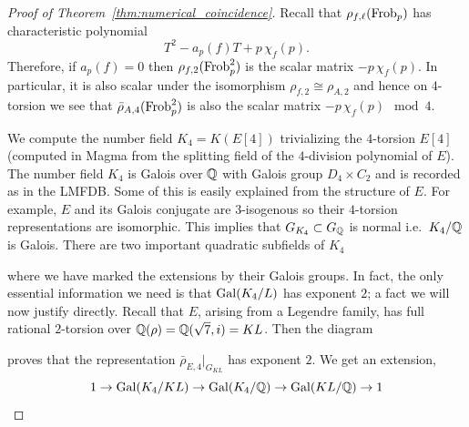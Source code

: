 \documentclass[main.tex]{subfiles}
\begin{document}
\begin{proof}[Proof of Theorem~\ref{thm:numerical_coincidence}]
Recall that $\rho_{f, \ell}(\operatorname{\mathrm{Frob}}_p)$ has characteristic polynomial
\[ T^2 - a_p(f) T + p \, \chi_f(p). \]
Therefore, if $a_p(f) = 0$ then $\rho_{f,2}(\operatorname{\mathrm{Frob}}_p^2)$ is the scalar matrix $-p \, \chi_f(p)$. In particular, it is also scalar under the isomorphism $\rho_{f,2} \cong \rho_{A,2}$ and hence on $4$-torsion we see that $\bar{\rho}_{A,4}(\operatorname{\mathrm{Frob}}_p^2)$ is also the scalar matrix  $-p \, \chi_f(p) \mod 4$.
\par 
We compute the number field $K_4 = K(E[4])$ trivializing the $4$-torsion $E[4]$ (computed in Magma from the splitting field of the $4$-division polynomial of $E$). The number field $K_4$ is Galois over $\mathbb{Q}$ with Galois group $D_4 \times C_2$ and is recorded as \cite{lmfdb:nf-16.0.24759631762948096.2} in the LMFDB. Some of this is easily explained from the structure of $E$. For example, $E$ and its Galois conjugate are $3$-isogenous so their $4$-torsion representations are isomorphic.  This implies that $G_{K_4} \subset G_{\mathbb{Q}}$ is normal i.e.\ $K_4 / \mathbb{Q}$ is Galois.  There are two important quadratic subfields of $K_4$
\begin{center}
\end{center}
where we have marked the extensions by their Galois groups. In fact, the only essential information we need is that $\operatorname{\mathrm{Gal}}(K_4 / L)$ has exponent $2$; a fact we will now justify directly. Recall that $E$, arising from a Legendre family, has full rational $2$-torsion over $\mathbb{Q}(\rho) = \mathbb{Q}(\sqrt{7}, i) = KL$. Then the diagram
\begin{center}
\end{center}
proves that the representation $\bar{\rho}_{E, 4}|_{G_{KL}}$ has exponent $2$. We get an extension,
\[ 1 \to \operatorname{\mathrm{Gal}}(K_4 / KL) \to \operatorname{\mathrm{Gal}}(K_4/\mathbb{Q}) \to \operatorname{\mathrm{Gal}}(KL/\mathbb{Q}) \to 1 \]

\end{proof}
\end{document}
